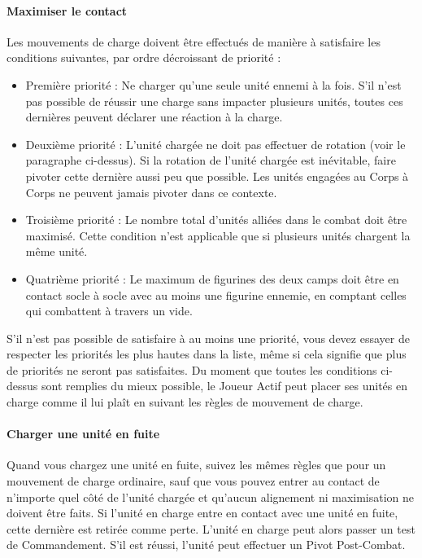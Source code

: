 \newpage
\paragraph{Maximiser le contact}

Les mouvements de charge doivent être effectués de manière à satisfaire les conditions suivantes, par ordre décroissant de priorité :

\begin{itemize}[label={-}]
\item Première priorité : Ne charger qu'une seule unité ennemi à la fois. S'il n'est pas possible de réussir une charge sans impacter plusieurs unités, toutes ces dernières peuvent déclarer une réaction à la charge.
\item Deuxième priorité : L'unité chargée ne doit pas effectuer de rotation (voir le paragraphe ci-dessus). Si la rotation de l'unité chargée est inévitable, faire pivoter cette dernière aussi peu que possible. Les unités engagées au Corps à Corps ne peuvent jamais pivoter dans ce contexte.
\item Troisième priorité : Le nombre total d'unités alliées dans le combat doit être maximisé. Cette condition n'est applicable que si plusieurs unités chargent la même unité.
\item Quatrième priorité : Le maximum de figurines des deux camps doit être en contact socle à socle avec au moins une figurine ennemie, en comptant celles qui combattent à travers un vide.
\end{itemize}

S'il n'est pas possible de satisfaire à au moins une priorité, vous devez essayer de respecter les priorités les plus hautes dans la liste, même si cela signifie que plus de priorités ne seront pas satisfaites. Du moment que toutes les conditions ci-dessus sont remplies du mieux possible, le Joueur Actif peut placer ses unités en charge comme il lui plaît en suivant les règles de mouvement de charge.

\paragraph{Charger une unité en fuite}

Quand vous chargez une unité en fuite, suivez les mêmes règles que pour un mouvement de charge ordinaire, sauf que vous pouvez entrer au contact de n'importe quel côté de l'unité chargée et qu'aucun alignement ni maximisation ne doivent être faits. Si l'unité en charge entre en contact avec une unité en fuite, cette dernière est retirée comme perte. L'unité en charge peut alors passer un test de Commandement. S'il est réussi, l'unité peut effectuer un Pivot Post-Combat.

